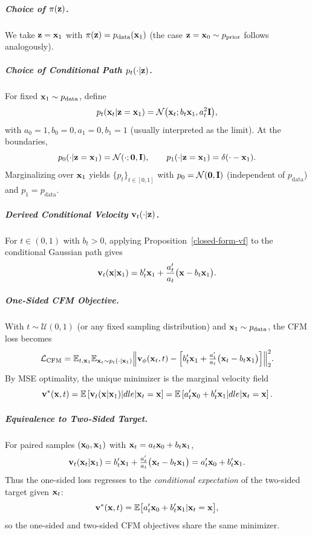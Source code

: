 \subparagraph{Choice of $\pi({\mathbf{z}})$.}
We take ${\mathbf{z}}={\mathbf{x}}_1$ with $\pi({\mathbf{z}})=p_{\mathrm{data}}({\mathbf{x}}_1)$ (the case ${\mathbf{z}}={\mathbf{x}}_0\sim p_{\mathrm{prior}}$ follows analogously).

\subparagraph{Choice of Conditional Path $p_t(\cdot|{\mathbf{z}})$.}
For fixed ${\mathbf{x}}_1\sim p_{\mathrm{data}}$, define
\[
p_t({\mathbf{x}}_t|{\mathbf{z}}={\mathbf{x}}_1)=\mathcal N \big({\mathbf{x}}_t; b_t {\mathbf{x}}_1, a_t^2 {\mathbf{I}}\big),
\]
with $ a_0=1, b_0=0, a_1=0, b_1=1$ (usually interpreted as the limit).
At the boundaries,
\[
p_0(\cdot|{\mathbf{z}}={\mathbf{x}}_1)=\mathcal N(\cdot; \bm 0,{\mathbf{I}}),\qquad
p_1(\cdot|{\mathbf{z}}={\mathbf{x}}_1)=\delta(\cdot - {\mathbf{x}}_1).
\]
Marginalizing over ${\mathbf{x}}_1$ yields $\{p_t\}_{t\in[0,1]}$ with
$p_0=\mathcal N(\bm 0,{\mathbf{I}})$ (independent of $p_{\mathrm{data}}$) and $p_1=p_{\mathrm{data}}$.

\subparagraph{Derived Conditional Velocity  ${\mathbf{v}}_t(\cdot|{\mathbf{z}})$.}
For $t\in(0,1)$ with $b_t>0$, applying Proposition~\ref{closed-form-vf} to the conditional Gaussian path gives
\[
\mathbf v_t({\mathbf{x}}|{\mathbf{x}}_1)
= b_t' {\mathbf{x}}_1 + \frac{a_t'}{a_t} \big({\mathbf{x}} - b_t {\mathbf{x}}_1\big).
\]

\subparagraph{One-Sided CFM Objective.}
With $t\sim\mathcal U(0,1)$ (or any fixed sampling distribution) and ${\mathbf{x}}_1\sim p_{\mathrm{data}}$, the CFM loss becomes
\begin{align}\label{eq:one-sided-cfm}
    \mathcal L_{\mathrm{CFM}}
=\mathbb{E}_{t,{\mathbf{x}}_1} \mathbb{E}_{{\mathbf{x}}_t\sim p_t(\cdot|{\mathbf{x}}_1)}
\Big\|\mathbf v_\phi({\mathbf{x}}_t,t)-
\Big[b_t'{\mathbf{x}}_1+\tfrac{a_t'}{a_t}\big({\mathbf{x}}_t-b_t{\mathbf{x}}_1\big)\Big]\Big\|_2^2.
\end{align}
By MSE optimality, the unique minimizer is the marginal velocity field
\[
\mathbf v^*({\mathbf{x}},t)
= \mathbb{E} \left[\mathbf v_t({\mathbf{x}}|{\mathbf{x}}_1) |dle|  {\mathbf{x}}_t={\mathbf{x}}\right]
= \mathbb{E} \left[a_t'{\mathbf{x}}_0+b_t'{\mathbf{x}}_1 |dle|  {\mathbf{x}}_t={\mathbf{x}}\right].
\]

\subparagraph{Equivalence to Two-Sided Target.}
For paired samples $({\mathbf{x}}_0,{\mathbf{x}}_1)$ with ${\mathbf{x}}_t=a_t{\mathbf{x}}_0+b_t{\mathbf{x}}_1$,
\[
\mathbf v_t({\mathbf{x}}_t|{\mathbf{x}}_1)
= b_t'{\mathbf{x}}_1 + \tfrac{a_t'}{a_t}\big({\mathbf{x}}_t-b_t{\mathbf{x}}_1\big)
= a_t'{\mathbf{x}}_0 + b_t'{\mathbf{x}}_1.
\]
Thus the one-sided loss regresses to the \emph{conditional expectation} of the two-sided target given ${\mathbf{x}}_t$:
\[
\mathbf v^*({\mathbf{x}},t)=\mathbb{E} \big[a_t'{\mathbf{x}}_0 + b_t'{\mathbf{x}}_1 | {\mathbf{x}}_t={\mathbf{x}}\big],
\]
so the one-sided and two-sided CFM objectives share the same minimizer.


